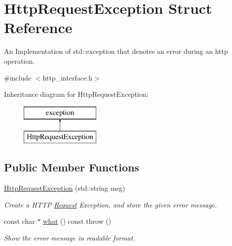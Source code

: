 \hypertarget{structHttpRequestException}{\section{Http\-Request\-Exception Struct Reference}
\label{structHttpRequestException}
}


An Implementation of std\-::exception that denotes an error during an http operation.  




{\ttfamily \#include $<$http\-\_\-interface.\-h$>$}

Inheritance diagram for Http\-Request\-Exception\-:\begin{figure}[H]
\begin{center}
\leavevmode
\includegraphics[height=2.000000cm]{structHttpRequestException}
\end{center}
\end{figure}
\subsection*{Public Member Functions}
\begin{DoxyCompactItemize}
\item 
\hypertarget{structHttpRequestException_a8470fe285f8e7f0939b5068546967764}{\hyperlink{structHttpRequestException_a8470fe285f8e7f0939b5068546967764}{Http\-Request\-Exception} (std\-::string msg)}\label{structHttpRequestException_a8470fe285f8e7f0939b5068546967764}

\begin{DoxyCompactList}\small\item\em Create a H\-T\-T\-P \hyperlink{structRequest}{Request} Exception, and store the given error message. \end{DoxyCompactList}\item 
\hypertarget{structHttpRequestException_acf07a2f7382157a27c0c5d2cedb2f2e6}{const char $\ast$ \hyperlink{structHttpRequestException_acf07a2f7382157a27c0c5d2cedb2f2e6}{what} () const   throw ()}\label{structHttpRequestException_acf07a2f7382157a27c0c5d2cedb2f2e6}

\begin{DoxyCompactList}\small\item\em Show the error message in readable format. \end{DoxyCompactList}\end{DoxyCompactItemize}
